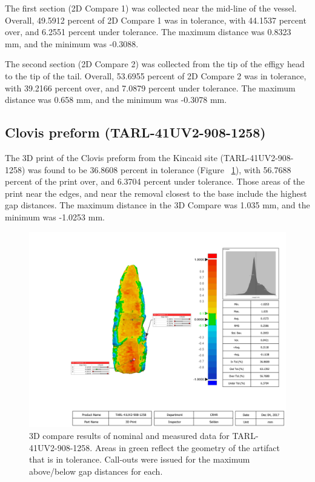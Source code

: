 \documentclass[review]{elsarticle}
\begin{document}
The first section (2D Compare 1) was collected near the mid-line of the vessel. Overall, 49.5912 percent of 2D Compare 1 was in tolerance, with 44.1537 percent over, and 6.2551 percent under tolerance. The maximum distance was 0.8323 mm, and the minimum was -0.3088.

The second section (2D Compare 2) was collected from the tip of the effigy head to the tip of the tail. Overall, 53.6955 percent of 2D Compare 2 was in tolerance, with 39.2166 percent over, and 7.0879 percent under tolerance. The maximum distance was 0.658 mm, and the minimum was -0.3078 mm.

\subsection*{Clovis preform (TARL-41UV2-908-1258)}

The 3D print of the Clovis preform from the Kincaid site (TARL-41UV2-908-1258) was found to be 36.8608 percent in tolerance (Figure ~\ref{fig:FigPreform}), with 56.7688 percent of the print over, and 6.3704 percent under tolerance. Those areas of the print near the edges, and near the removal closest to the base include the highest gap distances. The maximum distance in the 3D Compare was 1.035 mm, and the minimum was -1.0253 mm.

\begin{figure}[ht]\centering
\includegraphics[width=\linewidth]{FigPreform}
\caption{3D compare results of nominal and measured data for TARL-41UV2-908-1258. Areas in green reflect the geometry of the artifact that is in tolerance. Call-outs were issued for the maximum above/below gap distances for each.}
\label{fig:FigPreform}
\end{figure}
\end{document}
